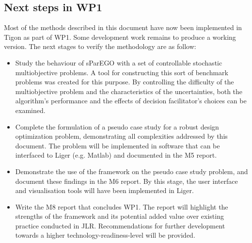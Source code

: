 \documentclass[a4paper]{article}
\begin{document}
\subsection{Next steps in WP1}
Most of the methods described in this document have now been implemented in Tigon as part of WP1. Some development work remains to produce a working version. The next stages to verify the methodology are as follow:
\begin{itemize}
	\item Study the behaviour of sParEGO with a set of controllable stochastic multiobjective problems. A tool for constructing this sort of benchmark problems was created for this purpose. By controlling the difficulty of the multiobjective problem and the characteristics of the uncertainties, both the algorithm's performance and the effects of decision facilitator's choices can be examined.
	\item Complete the formulation of a pseudo case study for a robust design optimization problem, demonstrating all complexities addressed by this document. The problem will be implemented in software that can be interfaced to Liger (e.g. Matlab) and documented in the M5 report.
	\item Demonstrate the use of the framework on the pseudo case study problem, and document these findings in the M6 report. By this stage, the user interface and visualisation tools will have been implemented in Liger.
	\item Write the M8 report that concludes WP1. The report will highlight the strengths of the framework and its potential added value over existing practice conducted in JLR. Recommendations for further development towards a higher technology-readiness-level will be provided.
\end{itemize}




\end{document}
